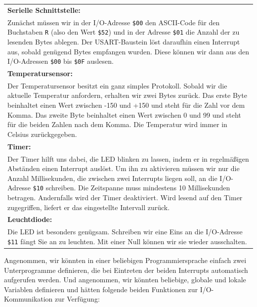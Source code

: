 \bigskip
{
    \setlength{\tabcolsep}{0pt}
    \small

    \begin{tabularx}{\textwidth}{X}
        \textbf{Serielle Schnittstelle:}
        \\
        Zunächst müssen wir in der I/O-Adresse \texttt{\$00} den ASCII-Code für den
        Buchstaben \texttt{R} (also den Wert \texttt{\$52}) und in der Adresse \texttt{\$01}
        die Anzahl der zu lesenden Bytes ablegen. Der USART-Baustein löst daraufhin einen
        Interrupt aus, sobald genügend Bytes empfangen wurden. Diese können wir dann
        aus den I/O-Adressen \texttt{\$00} bis \texttt{\$0F} auslesen.
        \\

        \smallskip
        \textbf{Temperatursensor:}
        \\
        Der Temperatursensor besitzt ein ganz simples Protokoll. Sobald wir die aktuelle
        Temperatur anfordern, erhalten wir zwei Bytes zurück. Das erste Byte beinhaltet
        einen Wert zwischen -150 und +150 und steht für die Zahl vor dem Komma. Das zweite
        Byte beinhaltet einen Wert zwischen 0 und 99 und steht für die beiden Zahlen
        nach dem Komma. Die Temperatur wird immer in Celsius zurückgegeben.
        \\

        \smallskip
        \textbf{Timer:}
        \\
        Der Timer hilft uns dabei, die LED blinken zu lassen, indem er in regelmäßigen
        Abständen einen Interrupt auslöst. Um ihn zu aktivieren müssen wir nur die Anzahl
        Millisekunden, die zwischen zwei Interrupts liegen soll, an die I/O-Adresse
        \texttt{\$10} schreiben. Die Zeitspanne muss mindestens 10 Millisekunden betragen.
        Andernfalls wird der Timer deaktiviert. Wird lesend auf den Timer zugegriffen,
        liefert er das eingestellte Intervall zurück.
        \\

        \smallskip
        \textbf{Leuchtdiode:}
        \\
        Die LED ist besonders genügsam. Schreiben wir eine Eins an die I/O-Adresse
        \texttt{\$11} fängt Sie an zu leuchten. Mit einer Null können wir sie wieder
        ausschalten.
        \\
    \end{tabularx}
}

\medskip
\teilaufgabe
Angenommen, wir könnten in einer beliebigen Programmiersprache einfach zwei
Unterprogramme definieren, die bei Eintreten der beiden Interrupts automatisch
aufgerufen werden. Und angenommen, wir könnten beliebige, globale und lokale
Variablen definieren und hätten folgende beiden Funktionen zur I/O-Kommunikation
zur Verfügung:

